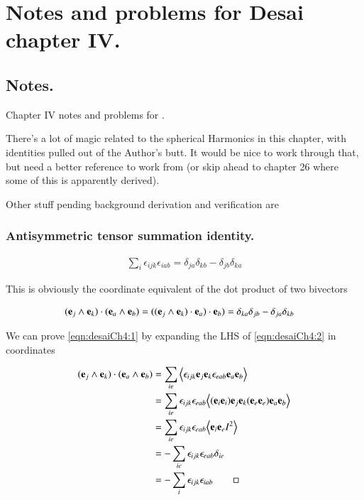 %
%

\chapter{Notes and problems for Desai chapter IV.}
\label{chap:desaiCh4}
{}
\date{Oct 10, 2010}

\beginArtWithToc

\section{Notes.}

Chapter IV notes and problems for \cite{desai2009quantum}.

There's a lot of magic related to the spherical Harmonics in this chapter, with identities pulled out of the Author's butt.  It would be nice to work through that, but need a better reference to work from (or skip ahead to chapter 26 where some of this is apparently derived).

Other stuff pending background derivation and verification are

\subsection{Antisymmetric tensor summation identity.}

\begin{align}\label{eqn:desaiCh4:1}
\sum_i \epsilon_{ijk} \epsilon_{iab} = \delta_{ja} \delta_{kb} - \delta_{jb}\delta_{ka}
\end{align}

This is obviously the coordinate equivalent of the dot product of two bivectors

\begin{align}\label{eqn:desaiCh4:2}
(\mathbf{e}_j \wedge \mathbf{e}_k) \cdot (\mathbf{e}_a \wedge \mathbf{e}_b) &=
( (\mathbf{e}_j \wedge \mathbf{e}_k) \cdot \mathbf{e}_a ) \cdot \mathbf{e}_b) =
\delta_{ka}\delta_{jb} - \delta_{ja}\delta_{kb}
\end{align}

We can prove \ref{eqn:desaiCh4:1} by expanding the LHS of \ref{eqn:desaiCh4:2} in coordinates

\begin{align*}
(\mathbf{e}_j \wedge \mathbf{e}_k) \cdot (\mathbf{e}_a \wedge \mathbf{e}_b)
&= \sum_{ie} {\left\langle{{
\epsilon_{ijk} \mathbf{e}_j \mathbf{e}_k \epsilon_{eab} \mathbf{e}_a \mathbf{e}_b
}}\right\rangle}_{} \\
&=
\sum_{ie}
\epsilon_{ijk} \epsilon_{eab}
{\left\langle{{
(\mathbf{e}_i \mathbf{e}_i) \mathbf{e}_j \mathbf{e}_k (\mathbf{e}_e \mathbf{e}_e) \mathbf{e}_a \mathbf{e}_b
}}\right\rangle}_{} \\
&=
\sum_{ie}
\epsilon_{ijk} \epsilon_{eab}
{\left\langle{{
\mathbf{e}_i \mathbf{e}_e I^2
}}\right\rangle}_{} \\
&=
-\sum_{ie} \epsilon_{ijk} \epsilon_{eab} \delta_{ie} \\
&=
-
\sum_i
\epsilon_{ijk} \epsilon_{iab}
\qquad\square
\end{align*}

